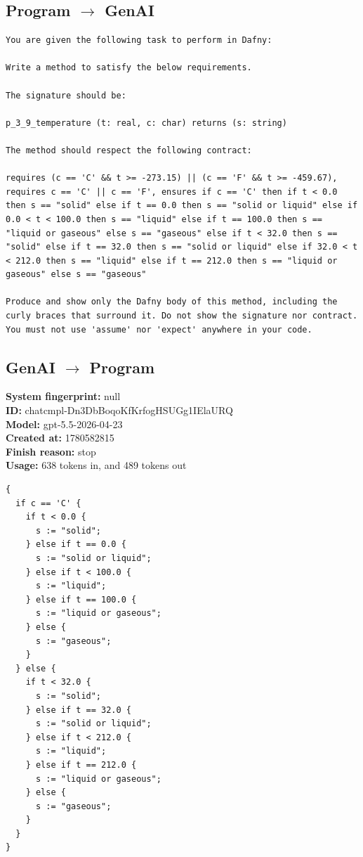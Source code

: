 \documentclass{article}
\begin{document}
\subsection*{Program $\rightarrow$ GenAI}
\begin{lstlisting}
You are given the following task to perform in Dafny:

Write a method to satisfy the below requirements.

The signature should be:

p_3_9_temperature (t: real, c: char) returns (s: string)

The method should respect the following contract:

requires (c == 'C' && t >= -273.15) || (c == 'F' && t >= -459.67), requires c == 'C' || c == 'F', ensures if c == 'C' then if t < 0.0 then s == "solid" else if t == 0.0 then s == "solid or liquid" else if 0.0 < t < 100.0 then s == "liquid" else if t == 100.0 then s == "liquid or gaseous" else s == "gaseous" else if t < 32.0 then s == "solid" else if t == 32.0 then s == "solid or liquid" else if 32.0 < t < 212.0 then s == "liquid" else if t == 212.0 then s == "liquid or gaseous" else s == "gaseous"

Produce and show only the Dafny body of this method, including the curly braces that surround it. Do not show the signature nor contract. You must not use 'assume' nor 'expect' anywhere in your code.
\end{lstlisting}
\subsection*{GenAI $\rightarrow$ Program}
\textbf{System fingerprint: }null
\\\textbf{ID: }chatcmpl-Dn3DbBoqoKfKrfogHSUGg1IElaURQ
\\\textbf{Model: }gpt-5.5-2026-04-23
\\\textbf{Created at: }1780582815
\\\textbf{Finish reason: }stop
\\\textbf{Usage: }638 tokens in, and 489 tokens out
\begin{lstlisting}
{
  if c == 'C' {
    if t < 0.0 {
      s := "solid";
    } else if t == 0.0 {
      s := "solid or liquid";
    } else if t < 100.0 {
      s := "liquid";
    } else if t == 100.0 {
      s := "liquid or gaseous";
    } else {
      s := "gaseous";
    }
  } else {
    if t < 32.0 {
      s := "solid";
    } else if t == 32.0 {
      s := "solid or liquid";
    } else if t < 212.0 {
      s := "liquid";
    } else if t == 212.0 {
      s := "liquid or gaseous";
    } else {
      s := "gaseous";
    }
  }
}
\end{lstlisting}
\end{document}
